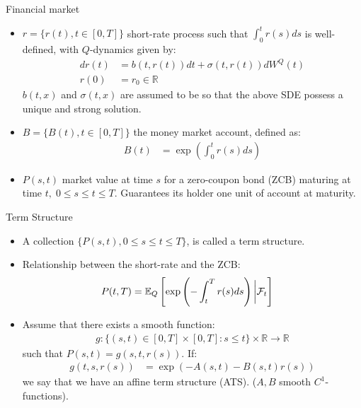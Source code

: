 \documentclass[UKenglish]{beamer}
\newcommand{\E}{\mathbb{E}}  %
\newcommand{\F}{\mathcal{F}} %
\newcommand{\R}{\mathbb{R}} %
\begin{document}
\begin{frame}{Financial market}
\begin{itemize}
    \item $r = \{r(t), t\in [0,T]\}$ short-rate process such that $\int_{0}^{t}r(s)ds$ is well-defined, with $Q$-dynamics given by: 
    \begin{align*}
    dr(t) &= b(t,r(t))dt + \sigma(t,r(t))dW^{Q}(t)  \\
    r(0) &= r_{0} \in \R
    \end{align*}
    $b(t,x)$ and $\sigma(t,x)$ are assumed to be so 
    that the above SDE possess a unique and strong solution. 
    \item $B = \{B(t), t\in [0,T]\}$ the money market account, defined as: 
    \begin{align*}
        B(t) &= \exp\left(
        \int_{0}^{t}r(s)ds
        \right)
    \end{align*}
    \item $P(s,t)$ market value at time $s$ for a zero-coupon bond (ZCB) maturing at time $t,\; 0\leq s\leq t \leq T$. Guarantees its holder one unit of account at maturity. 
\end{itemize}
\end{frame}

\begin{frame}{Term Structure}
    \begin{itemize}
        \item A collection $\{P(s,t), 0\leq s \leq t \leq T\}$,  is called a term structure.
        \item Relationship between the short-rate and the ZCB:
        \begin{align*}
        P(t,T) &= \E_{Q}\left[
        \exp\left(
        -\int_{t}^{T}r(s)ds
        \right)\bigg{|}\F_{t}
        \right]    
        \end{align*}
    \item Assume that there exists a smooth function: 
    \begin{align*}
        g:\{(s,t)\in [0,T]\times [0,T]: s\leq t\}\times \R \to \R
    \end{align*}
    such that $P(s,t) = g(s,t,r(s))$. If: 
    \begin{align*}
    g(t,s,r(s)) &= \exp\left(
    -A(s,t)-B(s,t)r(s)
    \right)    
    \end{align*}
    we say that we have an affine term structure (ATS). ($A,B$ smooth $C^{1}$-functions).  
    \end{itemize}
\end{frame}
\end{document}
